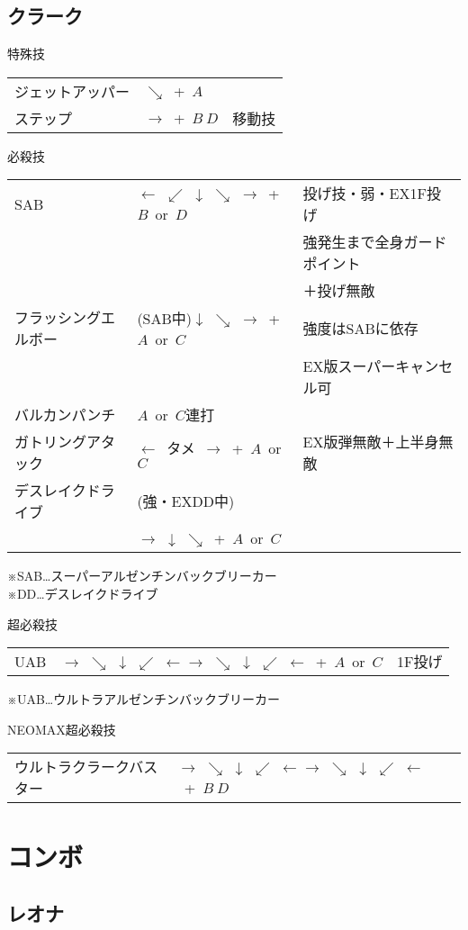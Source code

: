 \documentclass[a4j,11pt]{jarticle}
\def\htame{$\leftarrow$\ タメ\ $\rightarrow$}
\def\hado{$\downarrow$ $\searrow$ $\rightarrow$}%
\def\syoryu{$\rightarrow$ $\downarrow$ $\searrow$}%
\def\yoga{$\leftarrow$ $\swarrow$ $\downarrow$ $\searrow$ $\rightarrow$}%
\def\gyakuyoga{$\rightarrow$ $\searrow$ $\downarrow$ $\swarrow$ $\leftarrow$}%
\begin{document}
\subsection{クラーク}
\begin{itembox}[l]{特殊技}
\begin{tabular}{lll}
ジェットアッパー&$\searrow$\ +\ $A$&\\
ステップ&$\rightarrow$\ +\ $B\ D$&移動技
\end{tabular}
\end{itembox}
\begin{itembox}[l]{必殺技}
\begin{tabular}{lll}
SAB&\yoga\ +\ $B$\ or\ $D$&投げ技・弱・EX1F投げ\\
&&強発生まで全身ガードポイント\\
&&＋投げ無敵\\
フラッシングエルボー&(SAB中)\hado\ +\ $A$\ or\ $C$&強度はSABに依存\\
&&EX版スーパーキャンセル可\\
バルカンパンチ&$A$\ or\ $C$連打&\\
ガトリングアタック&\htame\ +\ $A$\ or\ $C$&EX版弾無敵＋上半身無敵\\
デスレイクドライブ&(強・EXDD中)&\\
&\syoryu\ +\ $A$\ or\ $C$&\\
\end{tabular}
\end{itembox}
※SAB…スーパーアルゼンチンバックブリーカー\\
※DD…デスレイクドライブ\\
\begin{itembox}[l]{超必殺技}
\begin{tabular}{lll}
UAB&\gyakuyoga\gyakuyoga\ +\ $A$\ or\ $C$&1F投げ
\end{tabular}
\end{itembox}
※UAB…ウルトラアルゼンチンバックブリーカー\\
\begin{itembox}[l]{NEOMAX超必殺技}
\begin{tabular}{lll}
ウルトラクラークバスター&\gyakuyoga\gyakuyoga\ +\ $B\ D$&
\end{tabular}
\end{itembox}
\newpage
\section{コンボ}
\subsection{レオナ}
\newpage
\end{document}
